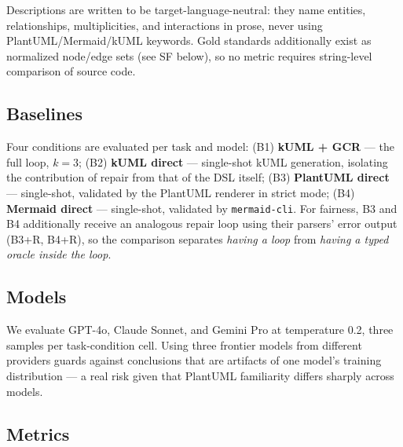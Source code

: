 \documentclass[acmsmall,nonacm]{acmart}
\begin{document}
Descriptions are written to be target-language-neutral: they name entities, relationships, multiplicities, and interactions in prose, never using PlantUML/Mermaid/kUML keywords. Gold standards additionally exist as normalized node/edge sets (see SF below), so no metric requires string-level comparison of source code.

\subsection{Baselines}

Four conditions are evaluated per task and model: (B1) \textbf{kUML + GCR} --- the full loop, $k = 3$; (B2) \textbf{kUML direct} --- single-shot kUML generation, isolating the contribution of repair from that of the DSL itself; (B3) \textbf{PlantUML direct} --- single-shot, validated by the PlantUML renderer in strict mode; (B4) \textbf{Mermaid direct} --- single-shot, validated by \texttt{mermaid-cli}. For fairness, B3 and B4 additionally receive an analogous repair loop using their parsers' error output (B3+R, B4+R), so the comparison separates \emph{having a loop} from \emph{having a typed oracle inside the loop}.

\subsection{Models}

We evaluate GPT-4o, Claude Sonnet, and Gemini Pro at temperature 0.2, three samples per task-condition cell. Using three frontier models from different providers guards against conclusions that are artifacts of one model's training distribution --- a real risk given that PlantUML familiarity differs sharply across models.

\subsection{Metrics}
\label{sec:metrics}
\end{document}
